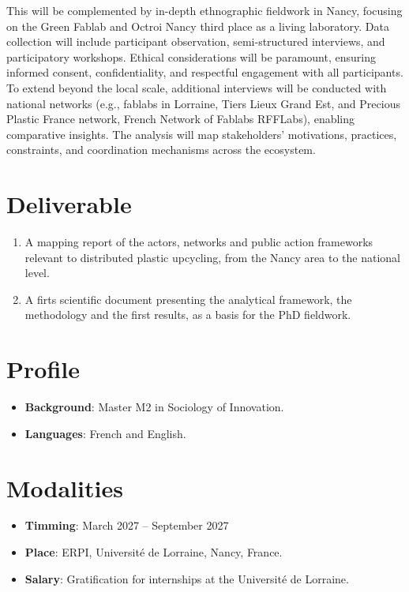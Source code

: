 \documentclass[
  12pt,
  openany]{book}
\providecommand{\tightlist}{%
  \setlength{\itemsep}{0pt}\setlength{\parskip}{0pt}}
\begin{document}
This will be complemented by in-depth ethnographic fieldwork in Nancy,
focusing on the Green Fablab and Octroi Nancy third place as a living
laboratory. Data collection will include participant observation,
semi-structured interviews, and participatory workshops. Ethical
considerations will be paramount, ensuring informed consent,
confidentiality, and respectful engagement with all participants. To
extend beyond the local scale, additional interviews will be conducted
with national networks (e.g., fablabs in Lorraine, Tiers Lieux Grand
Est, and Precious Plastic France network, French Network of Fablabs
RFFLabs), enabling comparative insights. The analysis will map
stakeholders' motivations, practices, constraints, and coordination
mechanisms across the ecosystem.

\section{Deliverable}\label{deliverable}

\begin{enumerate}
\def\labelenumi{\arabic{enumi}.}
\tightlist
\item
  A mapping report of the actors, networks and public action frameworks
  relevant to distributed plastic upcycling, from the Nancy area to the
  national level.
\item
  A firts scientific document presenting the analytical framework, the
  methodology and the first results, as a basis for the PhD fieldwork.
\end{enumerate}

\section{Profile}\label{profile}

\begin{itemize}
\tightlist
\item
  \textbf{Background}: Master M2 in Sociology of Innovation.
\item
  \textbf{Languages}: French and English.
\end{itemize}

\section{Modalities}\label{modalities}

\begin{itemize}
\tightlist
\item
  \textbf{Timming}: March 2027 -- September 2027
\item
  \textbf{Place}: ERPI, Université de Lorraine, Nancy, France.
\item
  \textbf{Salary}: Gratification for internships at the Université de
  Lorraine.
\end{itemize}
\end{document}
